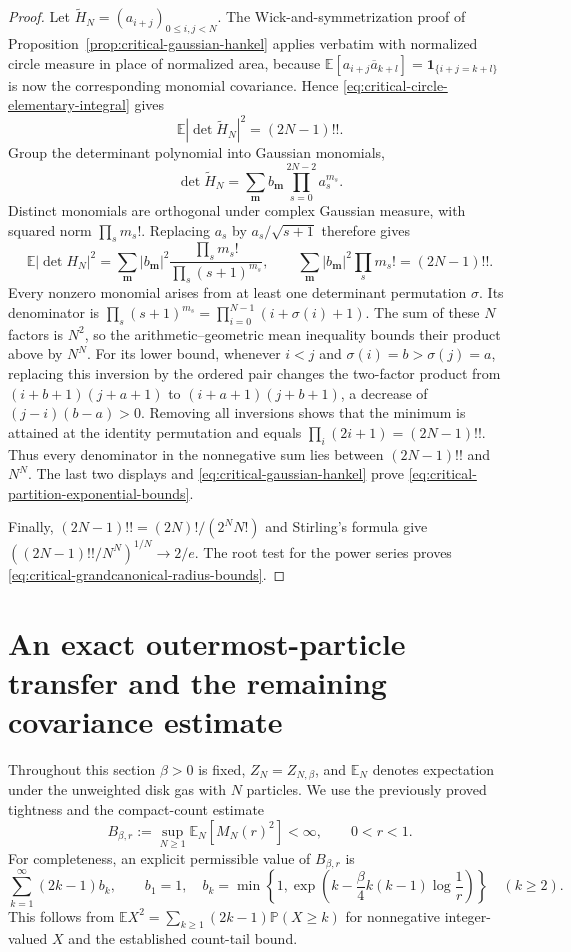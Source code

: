 \documentclass[11pt,a4paper]{article}
\numberwithin{equation}{section}
\theoremstyle{definition}
\theoremstyle{remark}
\newcommand{\E}{\mathbb E}
\newcommand{\Pbb}{\mathbb P}
\begin{document}
\begin{proof}
Let $\widetilde H_N=(a_{i+j})_{0\leq i,j<N}$. The Wick-and-symmetrization
proof of Proposition~\ref{prop:critical-gaussian-hankel} applies verbatim
with normalized circle measure in place of normalized area, because
$\mathbb E[a_{i+j}\overline a_{k+l}]=\mathbf1_{\{i+j=k+l\}}$
is now the corresponding monomial covariance. Hence
\eqref{eq:critical-circle-elementary-integral} gives
\[
 \mathbb E|\det\widetilde H_N|^2=(2N-1)!!.
\]
Group the determinant polynomial into Gaussian monomials,
\[
 \det\widetilde H_N=\sum_{\mathbf m}b_{\mathbf m}
                         \prod_{s=0}^{2N-2}a_s^{m_s}.
\]
Distinct monomials are orthogonal under complex Gaussian measure, with
squared norm $\prod_s m_s!$. Replacing $a_s$ by $a_s/\sqrt{s+1}$
therefore gives
\[
 \mathbb E|\det H_N|^2
 =\sum_{\mathbf m}|b_{\mathbf m}|^2
             \frac{\prod_s m_s!}{\prod_s(s+1)^{m_s}},
 \qquad
 \sum_{\mathbf m}|b_{\mathbf m}|^2\prod_s m_s!=(2N-1)!!.
\]
Every nonzero monomial arises from at least one determinant permutation
$\sigma$. Its denominator is
$\prod_s(s+1)^{m_s}=\prod_{i=0}^{N-1}(i+\sigma(i)+1)$.
The sum of these $N$ factors is $N^2$, so the arithmetic--geometric mean
inequality bounds their product above by $N^N$.
For its lower bound, whenever $i<j$ and $\sigma(i)=b>\sigma(j)=a$,
replacing this inversion by the ordered pair changes the two-factor
product from $(i+b+1)(j+a+1)$ to $(i+a+1)(j+b+1)$, a decrease of
$(j-i)(b-a)>0$. Removing all inversions shows that the minimum is attained
at the identity permutation and equals $\prod_i(2i+1)=(2N-1)!!$.
Thus every denominator in the nonnegative sum lies between
$(2N-1)!!$ and $N^N$. The last two displays and
\eqref{eq:critical-gaussian-hankel} prove
\eqref{eq:critical-partition-exponential-bounds}.

Finally, $(2N-1)!!=(2N)!/(2^NN!)$ and Stirling's formula give
$((2N-1)!!/N^N)^{1/N}\to2/e$.
The root test for the power series proves
\eqref{eq:critical-grandcanonical-radius-bounds}.
\end{proof}

\section{An exact outermost-particle transfer and the remaining covariance estimate}
\label{sec:uniqueness-transfer}

Throughout this section $\beta>0$ is fixed, $Z_N=Z_{N,\beta}$, and
$\E_N$ denotes expectation under the unweighted disk gas with $N$
particles. We use the previously proved tightness and the compact-count
estimate
\begin{equation}\label{transfer:count-input}
 B_{\beta,r}:=\sup_{N\ge1}\E_N[M_N(r)^2]<\infty,
 \qquad 0<r<1.
\end{equation}
For completeness, an explicit permissible value of $B_{\beta,r}$ is
\[
 \sum_{k=1}^{\infty}(2k-1)b_k,
 \qquad b_1=1,\quad
 b_k=\min\left\{1,
 \exp\left(k-\frac\beta4k(k-1)\log\frac1r\right)\right\}
 \quad(k\ge2).
\]
This follows from $\E X^2=\sum_{k\ge1}(2k-1)\Pbb(X\ge k)$ for
nonnegative integer-valued $X$ and the established count-tail bound.
\end{document}
